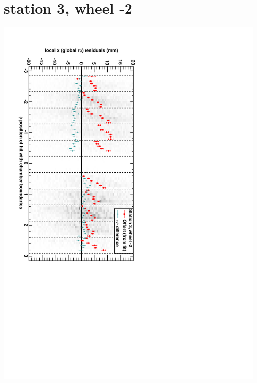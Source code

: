 \documentclass[compress]{beamer}
\begin{document}
\section*{station 3, wheel -2}
\begin{frame} \vfill \mbox{\hspace{-1 cm}\includegraphics[height=1.2\linewidth, angle=90]{DTrphiVsPhi_st3_whA.pdf}} \end{frame}
\end{document}
